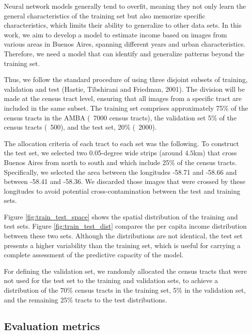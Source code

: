 \documentclass[conference]{IEEEtran}
\begin{document}
Neural network models generally tend to overfit, meaning they not only learn the general characteristics of the training set but also memorize specific characteristics, which limits their ability to generalize to other data sets. In this work, we aim to develop a model to estimate income based on images from various areas in Buenos Aires, spanning different years and urban characteristics. Therefore, we need a model that can identify and generalize patterns beyond the training set.

Thus, we follow the standard procedure of using three disjoint subsets of training, validation and test (Hastie, Tibshirani and Friedman, 2001). The division will be made at the census tract level, ensuring that all images from a specific tract are included in the same subset. The training set comprises approximately 75\% of the census tracts in the AMBA (~7000 census tracts), the validation set 5\% of the census tracts (~500), and the test set, 20\% (~2000).

The allocation criteria of each tract to each set was the following. To construct the test set, we selected two 0.05-degree wide strips (around $4.5$km) that cross Buenos Aires from north to south and which include 25\% of the census tracts. Specifically, we selected the area between the longitudes -58.71 and -58.66 and between -58.41 and -58.36. We discarded those images that were crossed by these longitudes to avoid potential cross-contamination between the test and training sets.

Figure \ref{fig:train_test_space} shows the spatial distribution of the training and test sets.  Figure \ref{fig:train_test_dist} compares the per capita income distribution between these two sets. Although the distributions are not identical, the test set presents a higher variability than the training set, which is useful for carrying a complete assessment of the predictive capacity of the model.

For defining the validation set, we randomly allocated the census tracts that were not used for the test set to the training and validation sets, to achieve a distribution of the 70\% census tracts in the training set, 5\% in the validation set, and the remaining 25\% tracts to the test distributions.

\subsection{Evaluation metrics} \label{sec:metricas}
\end{document}
